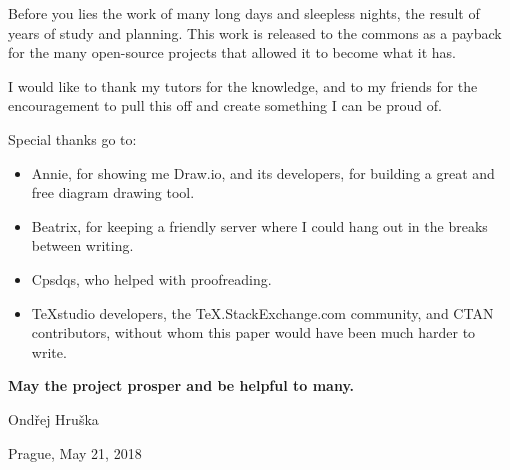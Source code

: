 \begin{thanks}

Before you lies the work of many long days and sleepless nights, the result of years of study and planning. This work is released to the commons as a payback for the many open-source projects that allowed it to become what it has.

I would like to thank my tutors for the knowledge, and to my friends for the encouragement to pull this off and create something I can be proud of. 

\vspace{10pt}
\noindent
Special thanks go to:

\vspace{-10pt}
\begin{itemize}
\item Annie, for showing me Draw.io, and its developers, for building a great and free diagram drawing tool.
\item Beatrix, for keeping a friendly server where I could hang out in the breaks between writing.
\item Cpsdqs, who helped with proofreading.
\item TeXstudio developers, the TeX.StackExchange.com community, and CTAN contributors, without whom this paper would have been much harder to write.
\end{itemize}

\noindent
\textbf{May the project prosper and be helpful to many.}

\vspace{25pt}
\noindent
Ondřej Hruška

\noindent
Prague, May 21, 2018

\end{thanks}
